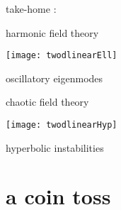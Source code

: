 \begin{frame}{take-home :   }
\begin{center}
            \begin{minipage}[c]{0.40\textwidth}\begin{center}
{\color{purple}harmonic} field theory
\bigskip

\texttt{[image: twodlinearEll]}\\
\bigskip

{\color{blue}oscillatory eigenmodes}
            \end{center}\end{minipage}
            \hspace{2ex}
            \begin{minipage}[c]{0.46\textwidth}\begin{center}
{\color{purple}chaotic} field theory\\
\bigskip

\texttt{[image: twodlinearHyp]}\\
\bigskip

{\color{blue}hyperbolic instabilities}
            \end{center}\end{minipage}
\end{center}
\end{frame} %


\section[a coin toss]
 {a coin toss}

